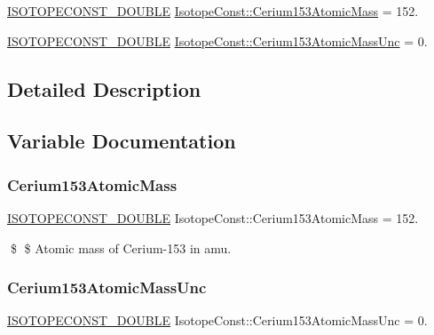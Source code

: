 \begin{DoxyCompactItemize}
\item 
\mbox{\hyperlink{group___isotope_const-_macros_ga8f45a7272ce02c0b4c65c44636ed719a}{I\+S\+O\+T\+O\+P\+E\+C\+O\+N\+S\+T\+\_\+\+D\+O\+U\+B\+LE}} \mbox{\hyperlink{group___isotope_const-_cerium-_ce153_ga4a06d7b9028311b568f6a21313b9fe68}{Isotope\+Const\+::\+Cerium153\+Atomic\+Mass}} = 152.
\item 
\mbox{\hyperlink{group___isotope_const-_macros_ga8f45a7272ce02c0b4c65c44636ed719a}{I\+S\+O\+T\+O\+P\+E\+C\+O\+N\+S\+T\+\_\+\+D\+O\+U\+B\+LE}} \mbox{\hyperlink{group___isotope_const-_cerium-_ce153_gaab0e9dfc8d302910cb664e16853a12f7}{Isotope\+Const\+::\+Cerium153\+Atomic\+Mass\+Unc}} = 0.
\end{DoxyCompactItemize}


\subsection{Detailed Description}


\subsection{Variable Documentation}
\mbox{\label{group___isotope_const-_cerium-_ce153_ga4a06d7b9028311b568f6a21313b9fe68}} 
\subsubsection{\texorpdfstring{Cerium153\+Atomic\+Mass}{Cerium153AtomicMass}}
{\footnotesize\ttfamily \mbox{\hyperlink{group___isotope_const-_macros_ga8f45a7272ce02c0b4c65c44636ed719a}{I\+S\+O\+T\+O\+P\+E\+C\+O\+N\+S\+T\+\_\+\+D\+O\+U\+B\+LE}} Isotope\+Const\+::\+Cerium153\+Atomic\+Mass = 152.}

\$ \$ Atomic mass of Cerium-\/153 in amu. \mbox{\label{group___isotope_const-_cerium-_ce153_gaab0e9dfc8d302910cb664e16853a12f7}} 
\subsubsection{\texorpdfstring{Cerium153\+Atomic\+Mass\+Unc}{Cerium153AtomicMassUnc}}
{\footnotesize\ttfamily \mbox{\hyperlink{group___isotope_const-_macros_ga8f45a7272ce02c0b4c65c44636ed719a}{I\+S\+O\+T\+O\+P\+E\+C\+O\+N\+S\+T\+\_\+\+D\+O\+U\+B\+LE}} Isotope\+Const\+::\+Cerium153\+Atomic\+Mass\+Unc = 0.}

